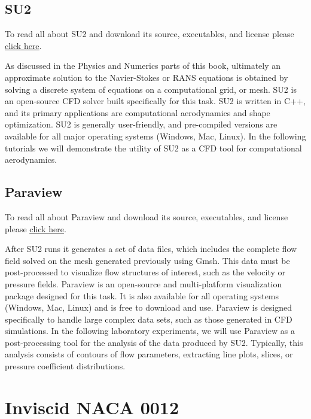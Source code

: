 \section{SU2}
\begin{su2note}
	To read all about SU2 and download its source, executables, and license please \href{https://su2code.github.io/}{\underline{click here}}.
\end{su2note}
As discussed in the Physics and Numerics parts of this book, ultimately an approximate solution to the Navier-Stokes or RANS equations is obtained by solving a discrete system of equations on a computational grid, or mesh. SU2 is an open-source CFD solver built specifically for this task. SU2 is written in C++, and its primary applications are computational aerodynamics and shape optimization. SU2 is generally user-friendly, and pre-compiled versions are available for all major operating systems (Windows, Mac, Linux). In the following tutorials we will demonstrate the utility of SU2 as a CFD tool for computational aerodynamics.

\section{Paraview}
\begin{paraviewnote}
	To read all about Paraview and download its source, executables, and license please \href{https://www.paraview.org/}{\underline{click here}}.
\end{paraviewnote}
After SU2 runs it generates a set of data files, which includes the complete flow field solved on the mesh generated previously using Gmsh. This data must be post-processed to visualize flow structures of interest, such as the velocity or pressure fields. Paraview is an open-source and multi-platform visualization package designed for this task. It is also available for all operating systems (Windows, Mac, Linux) and is free to download and use. Paraview is designed specifically to handle large complex data sets, such as those generated in CFD simulations. In the following laboratory experiments, we will use Paraview as a post-processing tool for the analysis of the data produced by SU2. Typically, this analysis consists of contours of flow parameters, extracting line plots, slices, or pressure coefficient distributions.

\chapter{Inviscid NACA 0012}
\label{ch:Inviscid NACA 0012}
